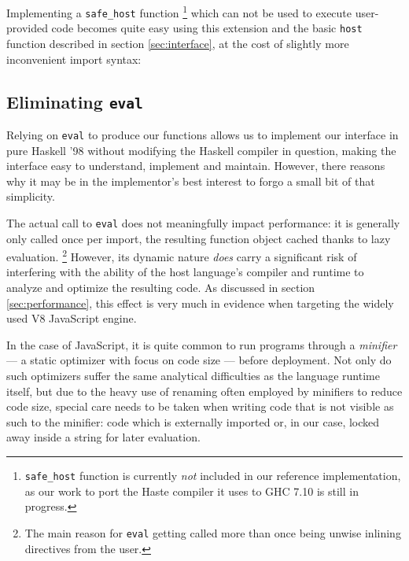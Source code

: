 \documentclass[preprint]{sigplanconf}
\begin{document}
Implementing a \lstinline!safe_host! function
\footnote{
  \lstinline!safe_host! function is currently \emph{not} included in our
  reference implementation, as our work to port the Haste compiler it uses to
  GHC 7.10 is still in progress.
}
which can not be used to execute user-provided code becomes quite easy using
this extension and the basic \lstinline!host! function described in section
\ref{sec:interface}, at the cost of slightly more inconvenient import syntax:


\subsection{Eliminating \lstinline!eval!}
\label{sec:inline-eval}
Relying on \lstinline!eval! to produce our functions allows us to
implement our interface in pure Haskell '98 without modifying the Haskell
compiler in question, making the interface easy to understand, implement and
maintain. However, there reasons why it may be in the implementor's best
interest to forgo a small bit of that simplicity.

The actual call to \lstinline!eval! does not meaningfully impact
performance: it is generally only called once per import,
the resulting function object cached thanks to lazy evaluation.
\footnote{The main reason for \lstinline!eval! getting called more than once
being unwise inlining directives from the user.}
However, its dynamic nature \emph{does}
carry a significant risk of interfering with the ability of the host language's
compiler and runtime to analyze and optimize the resulting code.
As discussed in section \ref{sec:performance}, this effect is very much in
evidence when targeting the widely used V8 JavaScript engine.

In the case of JavaScript, it is quite common to run programs through a
\emph{minifier} --- a static optimizer with focus on code size --- before
deployment. Not only do such optimizers suffer the same analytical
difficulties as the language runtime itself, but due to the heavy use of
renaming often employed by minifiers to reduce code size, special care needs
to be taken when writing code that is not visible as such to the minifier:
code which is externally imported or, in our case, locked away inside a string
for later evaluation.
\end{document}
